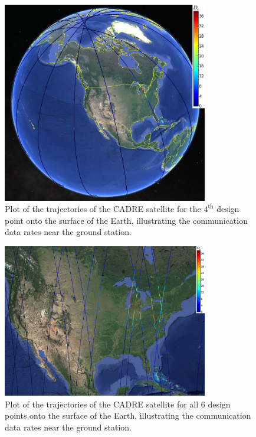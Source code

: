\documentclass[]{aiaa-tc} %
\begin{document}
\begin{figure}
\centering
\includegraphics[width=0.8\textwidth]{images/pt3_gearth3.png}
\caption[width=0.4\textwidth]{Plot of the trajectories of the CADRE satellite
for the $4^{\textrm{th}}$ design point onto the surface of the Earth, illustrating the
communication data rates near the ground station.}
\label{pt3_g_earth}
\end{figure}


\begin{figure}
\centering
\includegraphics[width=0.8\textwidth]{images/allpts_map_data.png}
\caption[width=0.4\textwidth]{Plot of the trajectories of the CADRE satellite
for all 6 design points onto the surface of the Earth, illustrating the
communication data rates near the ground station.}
\label{allpt_flatmap}
\end{figure}
\end{document}

